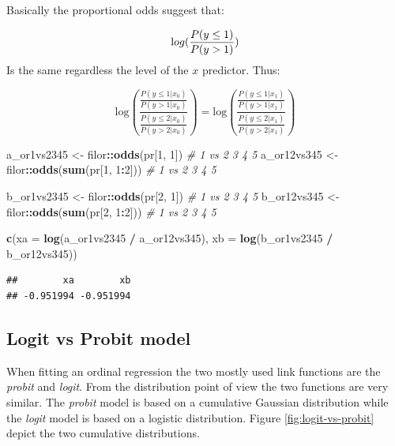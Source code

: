 \documentclass[
  man,floatsintext]{apa6}
\newenvironment{Shaded}{\begin{snugshade}}{\end{snugshade}}
\newcommand{\AttributeTok}[1]{\textcolor[rgb]{0.13,0.29,0.53}{#1}}
\newcommand{\CommentTok}[1]{\textcolor[rgb]{0.56,0.35,0.01}{\textit{#1}}}
\newcommand{\DecValTok}[1]{\textcolor[rgb]{0.00,0.00,0.81}{#1}}
\newcommand{\FunctionTok}[1]{\textcolor[rgb]{0.13,0.29,0.53}{\textbf{#1}}}
\newcommand{\NormalTok}[1]{#1}
\newcommand{\OtherTok}[1]{\textcolor[rgb]{0.56,0.35,0.01}{#1}}
\newcommand{\SpecialCharTok}[1]{\textcolor[rgb]{0.81,0.36,0.00}{\textbf{#1}}}
\begin{document}
Basically the proportional odds suggest that:

\[
\text log(\frac{P(y \leq 1)}{P(y > 1)})
\]
Is the same regardless the level of the \(x\) predictor. Thus:

\[
\text{log}\left(\frac{\frac{P(y \leq 1|x_0)}{P(y > 1|x_0)}}{\frac{P(y \leq 2|x_0)}{P(y > 2|x_0)}}\right) = \text{log}\left(\frac{\frac{P(y \leq 1|x_1)}{P(y > 1|x_1)}}{\frac{P(y \leq 2|x_1)}{P(y > 2|x_1)}}\right)
\]

\begin{Shaded}
\begin{Highlighting}[]
\NormalTok{a\_or1vs2345 }\OtherTok{\textless{}{-}}\NormalTok{ filor}\SpecialCharTok{::}\FunctionTok{odds}\NormalTok{(pr[}\DecValTok{1}\NormalTok{, }\DecValTok{1}\NormalTok{]) }\CommentTok{\# 1 vs 2 3 4 5}
\NormalTok{a\_or12vs345 }\OtherTok{\textless{}{-}}\NormalTok{ filor}\SpecialCharTok{::}\FunctionTok{odds}\NormalTok{(}\FunctionTok{sum}\NormalTok{(pr[}\DecValTok{1}\NormalTok{, }\DecValTok{1}\SpecialCharTok{:}\DecValTok{2}\NormalTok{])) }\CommentTok{\# 1 vs 2 3 4 5}

\NormalTok{b\_or1vs2345 }\OtherTok{\textless{}{-}}\NormalTok{ filor}\SpecialCharTok{::}\FunctionTok{odds}\NormalTok{(pr[}\DecValTok{2}\NormalTok{, }\DecValTok{1}\NormalTok{]) }\CommentTok{\# 1 vs 2 3 4 5}
\NormalTok{b\_or12vs345 }\OtherTok{\textless{}{-}}\NormalTok{ filor}\SpecialCharTok{::}\FunctionTok{odds}\NormalTok{(}\FunctionTok{sum}\NormalTok{(pr[}\DecValTok{2}\NormalTok{, }\DecValTok{1}\SpecialCharTok{:}\DecValTok{2}\NormalTok{])) }\CommentTok{\# 1 vs 2 3 4 5}

\FunctionTok{c}\NormalTok{(}\AttributeTok{xa =} \FunctionTok{log}\NormalTok{(a\_or1vs2345 }\SpecialCharTok{/}\NormalTok{ a\_or12vs345), }\AttributeTok{xb =} \FunctionTok{log}\NormalTok{(b\_or1vs2345 }\SpecialCharTok{/}\NormalTok{ b\_or12vs345))}
\end{Highlighting}
\end{Shaded}

\begin{verbatim}
##        xa        xb 
## -0.951994 -0.951994
\end{verbatim}

\subsection{Logit vs Probit model}\label{logit-vs-probit-model}

When fitting an ordinal regression the two mostly used link functions are the \emph{probit} and \emph{logit}. From the distribution point of view the two functions are very similar. The \emph{probit} model is based on a cumulative Gaussian distribution while the \emph{logit} model is based on a logistic distribution. Figure \ref{fig:logit-vs-probit} depict the two cumulative distributions.
\end{document}
